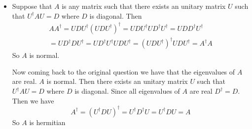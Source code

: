 \documentclass[a4paper, 11pt]{article}
\newtheorem{lemma}{Lemma}
\renewenvironment{proof}{\noindent{\it \textbf{Proof:}}\hspace*{1em}}{\qed\bigskip\\}
\begin{document}
{\begin{itemize}
\begin{lemma}
	 A matrix $A$ is diagonalizable with a unitary matrix if and only if $A$ is normal
\end{lemma}
	
	\begin{proof}
		 Let $A$ is normal. Then by Lemma 2 there  is a unitary matrix $U$ and a upper traingular matrix $T$ such that $A=UTU^{\dagger}$. Then \begin{multline*}
		TT^{\dagger}=U^{\dagger}AU(U^{\dagger}AU)^{\dagger}=U^{\dagger}AUU^{\dagger} A^{\dagger} U	=U^{\dagger}A A^{\dagger} U\\
	=U^{\dagger} A^{\dagger}A U=U^{\dagger} A^{\dagger}UU^{\dagger}A U=(U^{\dagger}AU)^{\dagger}U^{\dagger}AU=T^{\dagger}T
	\end{multline*}Now let $T+(t_{i,j})_{1\leq i,j\leq n}$. Then the first diagonal entry of $TT^{\dagger}$ is $$\sum_{i=1}^n  t_{1,i} \overline{t_{1,i}}=\sum_{i=1}^n |t_{1,i}|^2$$ Now the first diagonal entry of $T^{\dagger}T$ is $t_{1,1}\ov{t_{1,1}}=|t_{1,1}|^2$. These two are equal. Hence for all $2\leq i\leq n$ we have $t_{1,i}=0$. Similarly comparing the second diagonal entry of $TT^{\dagger} $ and $T^{\dagger}T$ we have that all the nondiagonal entries of second row of $T$ is 0.  Continuing like this we have that $T$ is diagonal. 
	\end{proof}
	
\item Suppose that $A$ is any matrix such that there exists an unitary matrix $U$ such that  $U^{\dagger}AU=D$ where $D$ is diagonal. Then \begin{multline*}
		AA^{\dagger}=UDU^{\dagger}(UDU^{\dagger})^{\dagger}=UDU^{\dagger}UD^{\dagger}U^{\dagger}=UDD^{\dagger}U^{\dagger}\\
		=UD^{\dagger}DU^{\dagger}=UD^{\dagger}U^{\dagger}UDU^{\dagger}=(UDU^{\dagger})^{\dagger}UDU^{\dagger}=A^{\dagger}A
	\end{multline*}So $A$ is normal.
	
	
	\parinn
	
	Now coming back to the original question we have that the eigenvalues of $A$ are real. $A$ is normal. Then  there exists an unitary matrix $U$ such that  $U^{\dagger}AU=D$ where $D$ is diagonal. Since all eigenvalues of $A$ are real $D^{\dagger}=D$. Then we have $$A^{\dagger}=(U^{\dagger}DU)^{\dagger}=U^{\dagger}D^{\dagger}U=U^{\dagger}DU=A$$So $A$ is hermitian
	
	\vspace{5mm}
	

\end{itemize}}
\end{document}
